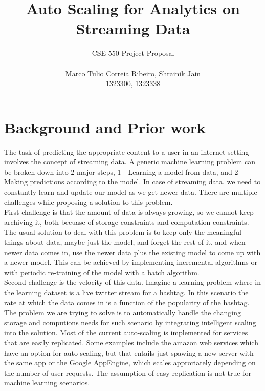 \documentclass[letterpaper]{article}
\title{Auto Scaling for Analytics on Streaming Data}
\date{}
\begin{document}
\author{CSE 550 Project Proposal \\\\ Marco Tulio Correia Ribeiro, Shrainik Jain\\ 1323300, 1323338}
\maketitle

\section{Background and Prior work}
The task of predicting the appropriate content to a user in an internet setting involves the concept of streaming data. A generic machine learning problem can be broken down into 2 major steps, 1 - Learning a model from data, and 2 - Making predictions according to the model. In case of streaming data, we need to constantly learn and update our model as we get newer data. There are multiple challenges while proposing a solution to this problem. \\First challenge is that the amount of data is always growing, so we cannot keep archiving it, both becuase of storage constraints and computation constraints. The usual solution to deal with this problem is to keep only the meaningful things about data, maybe just the model, and forget the rest of it, and when newer data comes in, use the newer data plus the existing model to come up with a newer model. This can be achieved by implementing incremental algorithms or with periodic re-training of the model with a batch algorithm. \\Second challenge is the velocity of this data. Imagine a learning problem where in the learning dataset is a live twitter stream for a hashtag. In this scenario the rate at which the data comes in is a function of the popularity of the hashtag. \\
The problem we are trying to solve is to automatically handle the changing storage and computions needs for such scenario by integrating intelligent scaling into the solution. Most of the current auto-scaling is implemented for services that are easily replicated. Some examples include the amazon web services which have an option for auto-scaling, but that entails just spawing a new server with the same app or the Google AppEngine, which scales approriately depending on the number of user requests. The assumption of easy replication is not true for machine learning scenarios.
\end{document}
